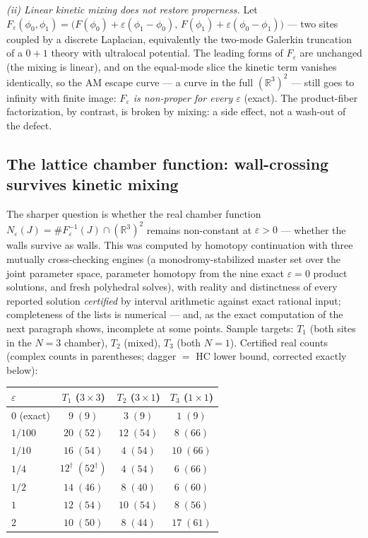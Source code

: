 \documentclass[11pt]{article}
\theoremstyle{definition}
\theoremstyle{remark}
\newcommand{\R}{\mathbb{R}}
\begin{document}
\emph{(ii) Linear kinetic mixing does not restore properness.} Let
$F_\varepsilon(\phi_0,\phi_1)=\bigl(F(\phi_0)+\varepsilon(\phi_1-\phi_0),\,
F(\phi_1)+\varepsilon(\phi_0-\phi_1)\bigr)$ — two sites coupled by a
discrete Laplacian, equivalently the two-mode Galerkin truncation of a
$0{+}1$ theory with ultralocal potential. The leading forms of
$F_\varepsilon$ are unchanged (the mixing is linear), and on the
equal-mode slice the kinetic term vanishes identically, so the AM
escape curve — a curve in the full $(\R^3)^2$ — still goes to infinity
with finite image: \emph{$F_\varepsilon$ is non-proper for every
$\varepsilon$} (exact). The product-fiber factorization, by contrast,
is broken by mixing: a side effect, not a wash-out of the defect.

\subsection{The lattice chamber function: wall-crossing survives
kinetic mixing}\label{sec:lattice}

The sharper question is whether the real chamber function
$N_\varepsilon(J)=\#F_\varepsilon^{-1}(J)\cap(\R^3)^2$ remains
non-constant at $\varepsilon>0$ — whether the walls survive as walls.
This was computed by homotopy continuation \cite{HCjl} with three
mutually cross-checking engines (a monodromy-stabilized master set
over the joint parameter space, parameter homotopy from the nine exact
$\varepsilon=0$ product solutions, and fresh polyhedral solves), with
reality and distinctness of every reported solution \emph{certified}
by interval arithmetic against exact rational input; completeness of
the lists is numerical --- and, as the exact computation of the next
paragraph shows, incomplete at some points. Sample
targets: $T_1$ (both sites in the $N{=}3$ chamber), $T_2$ (mixed),
$T_3$ (both $N{=}1$). Certified real counts (complex counts in
parentheses; dagger $=$ HC lower bound, corrected exactly below):

\begin{center}
\small
\begin{tabular}{lccc}
\hline
$\varepsilon$ & $T_1$ ($3\times3$) & $T_2$ ($3\times1$) & $T_3$
($1\times1$) \\
\hline
$0$ (exact) & $9\;(9)$ & $3\;(9)$ & $1\;(9)$ \\
$1/100$ & $20\;(52)$ & $12\;(54)$ & $8\;(66)$ \\
$1/10$ & $16\;(54)$ & $4\;(54)$ & $10\;(66)$ \\
$1/4$ & $12^\dagger\;(52^\dagger)$ & $4\;(54)$ & $6\;(66)$ \\
$1/2$ & $14\;(46)$ & $8\;(40)$ & $6\;(60)$ \\
$1$ & $12\;(54)$ & $10\;(54)$ & $8\;(56)$ \\
$2$ & $10\;(50)$ & $8\;(44)$ & $17\;(61)$ \\
\hline
\end{tabular}
\end{center}
\end{document}
